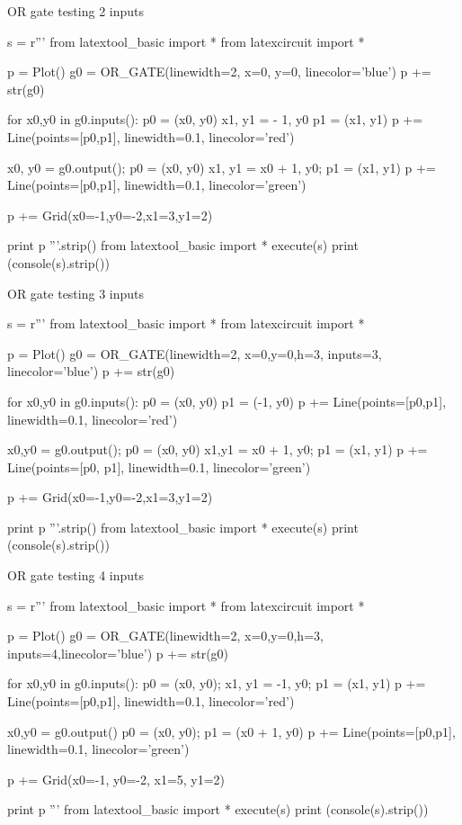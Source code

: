 \newpage
OR gate testing 2 inputs
\begin{python}
s = r'''
from latextool_basic import *
from latexcircuit import *

p = Plot()
g0 = OR_GATE(linewidth=2, x=0, y=0, linecolor='blue')
p += str(g0)

for x0,y0 in g0.inputs():
    p0 = (x0, y0)
    x1, y1 = - 1, y0
    p1 = (x1, y1)
    p += Line(points=[p0,p1], linewidth=0.1, linecolor='red')

x0, y0 = g0.output(); p0 = (x0, y0)
x1, y1 = x0 + 1, y0; p1 = (x1, y1)
p += Line(points=[p0,p1], linewidth=0.1, linecolor='green')

p += Grid(x0=-1,y0=-2,x1=3,y1=2)

print p
'''.strip()
from latextool_basic import *
execute(s)
print (console(s).strip())
\end{python}



\newpage
OR gate testing 3 inputs
\begin{python}
s = r'''
from latextool_basic import *
from latexcircuit import *

p = Plot()
g0 = OR_GATE(linewidth=2, x=0,y=0,h=3, inputs=3, linecolor='blue')
p += str(g0)

for x0,y0 in g0.inputs():
    p0 = (x0, y0)
    p1 = (-1, y0)
    p += Line(points=[p0,p1], linewidth=0.1, linecolor='red')

x0,y0 = g0.output(); p0 = (x0, y0)
x1,y1 = x0 + 1, y0; p1 = (x1, y1)
p += Line(points=[p0, p1], linewidth=0.1, linecolor='green')

p += Grid(x0=-1,y0=-2,x1=3,y1=2)

print p
'''.strip()
from latextool_basic import *
execute(s)
print (console(s).strip())
\end{python}


\newpage
OR gate testing 4 inputs
\begin{python}
s = r'''
from latextool_basic import *
from latexcircuit import *

p = Plot()
g0 = OR_GATE(linewidth=2, x=0,y=0,h=3, inputs=4,linecolor='blue')
p += str(g0)

for x0,y0 in g0.inputs():
    p0 = (x0, y0); x1, y1 = -1, y0; p1 = (x1, y1)
    p += Line(points=[p0,p1], linewidth=0.1, linecolor='red')

x0,y0 = g0.output()
p0 = (x0, y0); p1 = (x0 + 1, y0)
p += Line(points=[p0,p1], linewidth=0.1, linecolor='green')

p += Grid(x0=-1, y0=-2, x1=5, y1=2)

print p
'''
from latextool_basic import *
execute(s)
print (console(s).strip())
\end{python}


